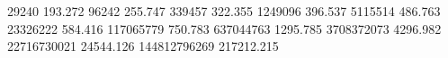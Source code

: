 29240        193.272
96242        255.747
339457       322.355
1249096      396.537
5115514      486.763
23326222     584.416
117065779    750.783
637044763    1295.785
3708372073   4296.982
22716730021  24544.126
144812796269 217212.215